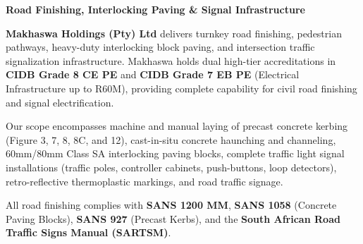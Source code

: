 \documentclass[a4paper,11pt]{article}
\begin{document}
\noindent
\begin{minipage}[t]{0.62\textwidth}
    \vspace{0pt}
    {\large\bfseries\color{mhnavy} Road Finishing, Interlocking Paving \& Signal Infrastructure}
    \vspace{0.12cm}

    {\fontsize{9pt}{13pt}\selectfont\color{mhtext}
    \textbf{Makhaswa Holdings (Pty) Ltd} delivers turnkey road finishing, pedestrian pathways, heavy-duty interlocking block paving, and intersection traffic signalization infrastructure. Makhaswa holds dual high-tier accreditations in \textbf{CIDB Grade 8 CE PE} and \textbf{CIDB Grade 7 EB PE} (Electrical Infrastructure up to R60M), providing complete capability for civil road finishing and signal electrification.
    }

    \vspace{0.22cm}

    {\fontsize{9pt}{13pt}\selectfont\color{mhtext}
    Our scope encompasses machine and manual laying of precast concrete kerbing (Figure 3, 7, 8, 8C, and 12), cast-in-situ concrete haunching and channeling, 60mm/80mm Class SA interlocking paving blocks, complete traffic light signal installations (traffic poles, controller cabinets, push-buttons, loop detectors), retro-reflective thermoplastic markings, and road traffic signage.
    }

    \vspace{0.22cm}

    {\fontsize{9pt}{13pt}\selectfont\color{mhtext}
    All road finishing complies with \textbf{SANS 1200 MM}, \textbf{SANS 1058} (Concrete Paving Blocks), \textbf{SANS 927} (Precast Kerbs), and the \textbf{South African Road Traffic Signs Manual (SARTSM)}.
    }
\end{minipage}
\hfill
\end{document}

